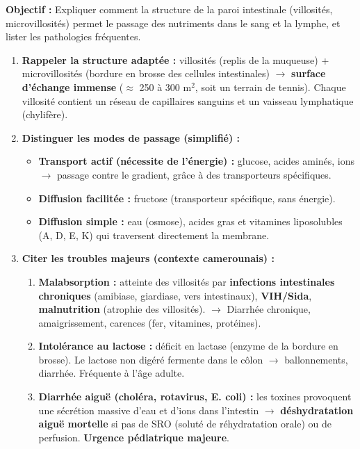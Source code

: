 \documentclass[11pt]{article}
\newcommand{\cle}[1]{{\popxbold\color{popdark}#1}}
\begin{document}
\begin{methode}
    \textbf{Objectif :} Expliquer comment la structure de la paroi intestinale (villosités, microvillosités) permet le passage des nutriments dans le sang et la lymphe, et lister les pathologies fréquentes.
    \begin{enumerate}
        \item \textbf{Rappeler la structure adaptée :} \cle{villosités} (replis de la muqueuse) + \cle{microvillosités} (bordure en brosse des cellules intestinales) $\rightarrow$ \textbf{surface d'échange immense} ($\approx$ 250 à 300 m$^2$, soit un terrain de tennis). Chaque villosité contient un réseau de capillaires sanguins et un vaisseau lymphatique (chylifère).
        \item \textbf{Distinguer les modes de passage (simplifié) :}
            \begin{itemize}
                \item \textbf{Transport actif (nécessite de l'énergie) :} glucose, acides aminés, ions $\rightarrow$ passage contre le gradient, grâce à des transporteurs spécifiques.
                \item \textbf{Diffusion facilitée :} fructose (transporteur spécifique, sans énergie).
                \item \textbf{Diffusion simple :} eau (osmose), acides gras et vitamines liposolubles (A, D, E, K) qui traversent directement la membrane.
            \end{itemize}
        \item \textbf{Citer les troubles majeurs (contexte camerounais) :}
            \begin{enumerate}
                \item \textbf{Malabsorption :} atteinte des villosités par \textbf{infections intestinales chroniques} (amibiase, giardiase, vers intestinaux), \textbf{VIH/Sida}, \textbf{malnutrition} (atrophie des villosités). $\rightarrow$ Diarrhée chronique, amaigrissement, carences (fer, vitamines, protéines).
                \item \textbf{Intolérance au lactose :} déficit en \cle{lactase} (enzyme de la bordure en brosse). Le lactose non digéré fermente dans le côlon $\rightarrow$ ballonnements, diarrhée. Fréquente à l'âge adulte.
                \item \textbf{Diarrhée aiguë (choléra, rotavirus, E. coli) :} les toxines provoquent une sécrétion massive d'eau et d'ions dans l'intestin $\rightarrow$ \textbf{déshydratation aiguë mortelle} si pas de \cle{SRO} (soluté de réhydratation orale) ou de perfusion. \textbf{Urgence pédiatrique majeure}.
            \end{enumerate}
    \end{enumerate}
\end{methode}
\end{document}
